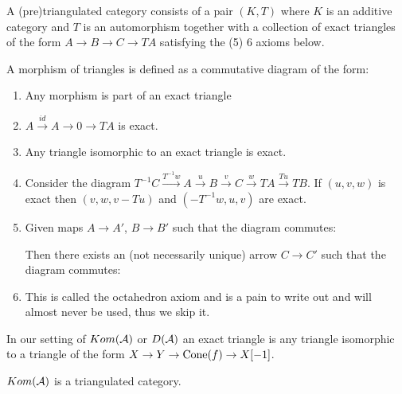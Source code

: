 \documentclass[a4paper, UKenglish]{report}
\begin{document}
A (pre)triangulated category consists of a pair $(K,T)$ where $K$ is an additive category and $T$ is an automorphism together with a collection of exact triangles of the form $A \to B \to C \to TA$ satisfying the  (5) 6 axioms below.

A morphism of triangles is defined as a commutative diagram of the form:

\begin{enumerate}
\item Any morphism is part of an exact triangle
\item $A \xrightarrow{id} A \to 0 \to TA$ is exact.
\item Any triangle isomorphic to an exact triangle is exact.
\item Consider the diagram $T^{-1}C \xrightarrow{T^{-1}w} A \xrightarrow{u} B \xrightarrow{v} C \xrightarrow{w} TA \xrightarrow{Tu} TB$. If $(u,v,w)$ is exact then $(v,w,v-Tu)$ and $(-T^{-1}w,u,v)$ are exact.
\item  Given maps $A \to A'$, $B \to B'$ such that the diagram commutes:


Then there exists an (not necessarily unique) arrow $C \to C'$ such that the diagram commutes:

\item This is called the octahedron axiom and is a pain to write out and will almost never be used, thus we skip it.
\end{enumerate}

In our setting of $Kom(\mathcal{A})$ or $D(\mathcal{A})$ an exact triangle is any triangle isomorphic to a triangle of the form $X \to Y \to \operatorname{Cone}(f) \to X[-1]$.
\begin{proposition}
$Kom(\mathcal{A})$ is a  triangulated category.
\end{proposition}
\end{document}
